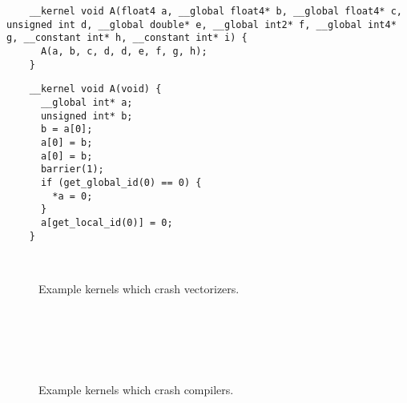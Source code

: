 \newsavebox{\NvidiaRecursionSegfault}
\begin{lrbox}{\NvidiaRecursionSegfault}
  \hspace{1.5em}
  \begin{lstlisting}
    __kernel void A(float4 a, __global float4* b, __global float4* c, unsigned int d, __global double* e, __global int2* f, __global int4* g, __constant int* h, __constant int* i) {
      A(a, b, c, d, d, e, f, g, h);
    }
  \end{lstlisting}
\end{lrbox}

\newsavebox{\XeonPhiSegfault}
\begin{lrbox}{\XeonPhiSegfault}
  \hspace{1.5em}
  \begin{lstlisting}
    __kernel void A(void) {
      __global int* a;
      unsigned int* b;
      b = a[0];
      a[0] = b;
      a[0] = b;
      barrier(1);
      if (get_global_id(0) == 0) {
        *a = 0;
      }
      a[get_local_id(0)] = 0;
    }
  \end{lstlisting}
\end{lrbox}

\begin{figure}
  \centering
  \\%
  \caption{Example kernels which crash vectorizers.}%
  \label{lst:vectorizer-crashes}%
\end{figure}

\begin{figure}
  \centering %
  \\%
  \\%
  \\%
  \\%
  \caption{Example kernels which crash compilers.}%
  \label{lst:compiler-crashes}%
\end{figure}

